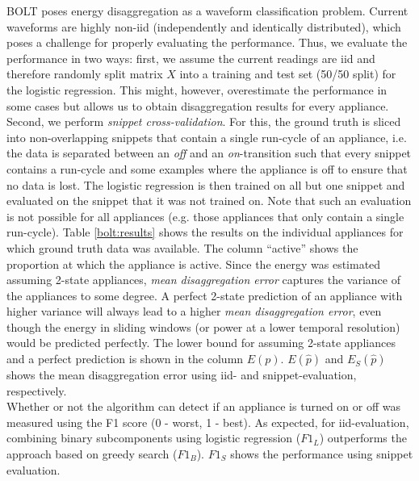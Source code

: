 BOLT poses energy disaggregation as a waveform classification problem. Current waveforms are highly non-iid (independently and identically distributed), which poses a challenge for properly evaluating the performance. Thus, we evaluate the performance in two ways: first, we assume the current readings are iid and therefore randomly split matrix $X$ into a training and test set (50/50 split) for the logistic regression. This might, however, overestimate the performance in some cases but allows us to obtain disaggregation results for every appliance. Second, we perform \emph{snippet cross-validation}. For this, the ground truth is sliced into non-overlapping snippets that contain a single run-cycle of an appliance, i.e. the data is separated between an \emph{off} and an \emph{on}-transition such that every snippet contains a run-cycle and some examples where the appliance is off to ensure that no data is lost. The logistic regression is then trained on all but one snippet and evaluated on the snippet that it was not trained on. Note that such an evaluation is not possible for all appliances (e.g. those appliances that only contain a single run-cycle).
Table \ref{bolt:results} shows the results on the individual appliances for which ground truth data was available. The column ``active'' shows the proportion at which the appliance is active. Since the energy was estimated assuming 2-state appliances, \emph{mean disaggregation error} captures the variance of the appliances to some degree. A perfect 2-state prediction of an appliance with higher variance will always lead to a higher \emph{mean disaggregation error}, even though the energy in sliding windows (or power at a lower temporal resolution) would be predicted perfectly. The lower bound for assuming 2-state appliances and a perfect prediction is shown in the column $E(p)$. $E(\hat{p})$ and $E_S(\hat{p})$ shows the mean disaggregation error using iid- and snippet-evaluation, respectively.\\
Whether or not the algorithm can detect if an appliance is turned on or off was measured using the F1 score (0 - worst, 1 - best). As expected, for iid-evaluation, combining binary subcomponents using logistic regression ($F1_{L}$) outperforms the approach based on greedy search ($F1_{B}$). $F1_{S}$ shows the performance using snippet evaluation.\\
